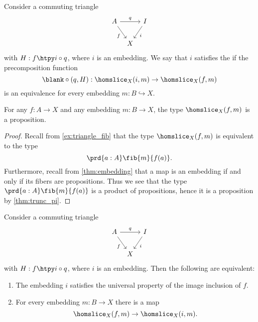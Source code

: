 \begin{defn}
Consider a commuting triangle
\begin{equation*}
\begin{tikzcd}[column sep=tiny]
A \arrow[rr,"q"] \arrow[dr,swap,"f"] & & I \arrow[dl,"i"] \\
& X
\end{tikzcd}
\end{equation*}
with $H:f\htpy i\circ q$, where $i$ is an embedding.
We say that $i$ satisfies the  if the precomposition function
\begin{equation*}
\blank\circ(q,H) : \homslice_X(i,m)\to\homslice_X(f,m)
\end{equation*}
is an equivalence for every embedding $m:B\hookrightarrow X$. 
\end{defn}

\begin{lem}
For any $f:A\to X$ and any embedding $m:B\to X$, the type $\homslice_X(f,m)$ is a proposition.
\end{lem}

\begin{proof}
  Recall from \cref{ex:triangle_fib} that the type $\homslice_X(f,m)$ is equivalent to the type
  \begin{equation*}
    \prd{a:A}\fib{m}{f(a)}.
  \end{equation*}
  Furthermore, recall from \cref{thm:embedding} that a map is an embedding if and only if its fibers are propositions.
  Thus we see that the type $\prd{a:A}\fib{m}{f(a)}$ is a product of propositions, hence it is a proposition by \cref{thm:trunc_pi}.
\end{proof}

\begin{prp}\label{prp:simplifly-universal-property-image}
  Consider a commuting triangle
  \begin{equation*}
    \begin{tikzcd}[column sep=tiny]
      A \arrow[rr,"q"] \arrow[dr,swap,"f"] & & I \arrow[dl,"i"] \\
      & X
\end{tikzcd}
  \end{equation*}
  with $H:f\htpy i\circ q$, where $i$ is an embedding. Then the following are equivalent:
  \begin{enumerate}
  \item The embedding $i$ satisfies the universal property of the image inclusion of $f$.
  \item For every embedding $m:B\to X$ there is a map
    \begin{equation*}
      \homslice_X(f,m)\to\homslice_X(i,m).
    \end{equation*}
  \end{enumerate}
\end{prp}

